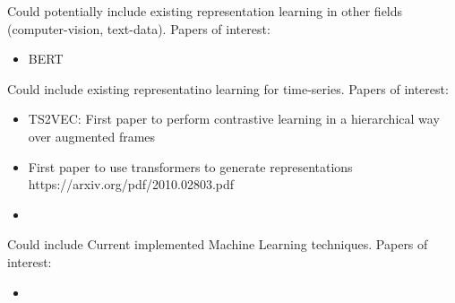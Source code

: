 




Could potentially include existing representation learning in other fields (computer-vision, text-data). Papers of interest:
\begin{itemize}
    \item BERT 
\end{itemize}
Could include existing representatino learning for time-series. Papers of interest:
\begin{itemize}
    \item TS2VEC: First paper to perform contrastive learning in a hierarchical way over augmented frames
    \item First paper to use transformers to generate representations https://arxiv.org/pdf/2010.02803.pdf
    \item 
\end{itemize}
Could include Current implemented Machine Learning techniques. Papers of interest:
\begin{itemize}
    \item 
\end{itemize}


